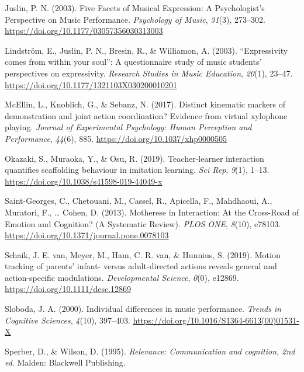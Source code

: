 \documentclass[
  english,
  man,floatsintext]{apa6}
\newlength{\cslhangindent}
\newenvironment{CSLReferences}[2] %
 {%
  \setlength{\parindent}{0pt}
  \ifodd #1 \everypar{\setlength{\hangindent}{\cslhangindent}}\ignorespaces\fi
  \ifnum #2 > 0
  \setlength{\parskip}{#2\baselineskip}
  \fi
 }%
 {}
\begin{document}
\begin{CSLReferences}{1}{0}
\leavevmode{}%
Juslin, P. N. (2003). Five {Facets} of {Musical Expression}: {A Psychologist}'s {Perspective} on {Music Performance}. \emph{Psychology of Music}, \emph{31}(3), 273--302. \url{https://doi.org/10.1177/03057356030313003}

\leavevmode{}%
Lindström, E., Juslin, P. N., Bresin, R., \& Williamon, A. (2003). {``{Expressivity} comes from within your soul''}: {A} questionnaire study of music students' perspectives on expressivity. \emph{Research Studies in Music Education}, \emph{20}(1), 23--47. \url{https://doi.org/10.1177/1321103X030200010201}

\leavevmode{}%
McEllin, L., Knoblich, G., \& Sebanz, N. (2017). Distinct kinematic markers of demonstration and joint action coordination? {Evidence} from virtual xylophone playing. \emph{Journal of Experimental Psychology: Human Perception and Performance}, \emph{44}(6), 885. \url{https://doi.org/10.1037/xhp0000505}

\leavevmode{}%
Okazaki, S., Muraoka, Y., \& Osu, R. (2019). Teacher-learner interaction quantifies scaffolding behaviour in imitation learning. \emph{Sci Rep}, \emph{9}(1), 1--13. \url{https://doi.org/10.1038/s41598-019-44049-x}

\leavevmode{}%
Saint-Georges, C., Chetouani, M., Cassel, R., Apicella, F., Mahdhaoui, A., Muratori, F., \ldots{} Cohen, D. (2013). Motherese in {Interaction}: {At} the {Cross}-{Road} of {Emotion} and {Cognition}? ({A Systematic Review}). \emph{PLOS ONE}, \emph{8}(10), e78103. \url{https://doi.org/10.1371/journal.pone.0078103}

\leavevmode{}%
Schaik, J. E. van, Meyer, M., Ham, C. R. van, \& Hunnius, S. (2019). Motion tracking of parents' infant- versus adult-directed actions reveals general and action-specific modulations. \emph{Developmental Science}, \emph{0}(0), e12869. \url{https://doi.org/10.1111/desc.12869}

\leavevmode{}%
Sloboda, J. A. (2000). Individual differences in music performance. \emph{Trends in Cognitive Sciences}, \emph{4}(10), 397--403. \url{https://doi.org/10.1016/S1364-6613(00)01531-X}

\leavevmode{}%
Sperber, D., \& Wilson, D. (1995). \emph{Relevance: {Communication} and cognition, 2nd ed}. {Malden}: {Blackwell Publishing}.


\end{CSLReferences}
\end{document}
